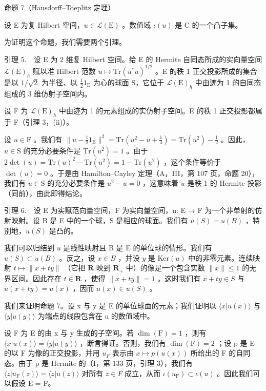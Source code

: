 命题 7（Hausdorff–Toeplitz 定理）

设 E 为复 Hilbert 空间，\(u \in \mathcal{L}(\mathrm{E})\) 。数值域 \(\iota(u)\) 是 C 的一个凸子集。

为证明这个命题，我们需要两个引理。

引理 5.　设 E 为 2 维复 Hilbert 空间。给 E 的 Hermite 自同态所成的实向量空间 \(\mathcal{L}(\mathrm{E})_h\) 赋以准 Hilbert 范数 \(u \mapsto \mathrm{Tr}(u^* u)^{1/2}\) 。E 的秩 1 正交投影所成的集合是以 \(1/\sqrt{2}\) 为半径、以 \(\frac{1}{2} 1_{\mathrm{E}}\) 为心的球面 S，它位于 \(\mathcal{L}(\mathrm{E})_h\) 中由迹为 1 的自同态组成的 3 维仿射子空间内。

设 F 为 \(\mathcal{L}(\mathrm{E})_h\) 中由迹为 1 的元素组成的实仿射子空间。E 的秩 1 正交投影都属于 F（引理 3，(ii)）。

设 \(u \in \mathrm{F}\) 。我们有 \(\| u - \frac{1}{2} 1_{\mathrm{E}} \|^{2} = \mathrm{Tr}(u^{2} - u + \frac{1}{4}) = \mathrm{Tr}(u^{2}) - \frac{1}{2}\) 。因此，\(u \in \mathrm{S}\) 的充分必要条件是 \(\mathrm{Tr}(u^{2}) = 1\) 。由于 \(2\det(u) = \mathrm{Tr}(u)^{2} - \mathrm{Tr}(u^{2}) = 1 - \mathrm{Tr}(u^{2})\) ，这个条件等价于 \(\det(u) = 0\) 。于是由 Hamilton–Cayley 定理（A，III，第 107 页，命题 20），我们有 \(u \in \mathrm{S}\) 的充分必要条件是 \(u^{2} - u = 0\) ，这意味着 \(u\) 是秩 1 的 Hermite 投影（同前），由此即得结论。

引理 6.　设 E 为实赋范向量空间，F 为实向量空间，u: E → F 为一个非单射的仿射映射。设 B 是 E 中的一个球，S 是相应的球面。我们有 \(u(S) = u(B)\) ，特别地，\(u(S)\) 是凸的。

我们可以归结到 \(u\) 是线性映射且 B 是 E 的单位球的情形。我们有 \(u(S) \subset u(B)\) 。反之，设 \(x \in B\) ，并设 \(y\) 是 \(\text{Ker}(u)\) 中的非零元素。连续映射 \(t \mapsto \|x + ty\|\) （它把 \(\mathbf{R}\) 映到 \(\mathbf{R}_+\) 中）的像是一个包含实数 \(\|x\| \leqslant 1\) 的无界区间。因此存在 \(t \in \mathbf{R}\) ，使得 \(\|x + ty\| = 1\) 。这时我们有 \(x + ty \in S\) 与 \(u(x + ty) = u(x)\) ，因而 \(u(x) \in u(S)\) 。

我们来证明命题 7。设 x 与 y 是 E 的单位球面的元素；我们证明以 \(\langle x|u(x)\rangle\) 与 \(\langle y|u(y)\rangle\) 为端点的线段包含在 u 的数值域中。

设 F 为 E 的由 x 与 y 生成的子空间。若 \(\dim(\mathrm{F}) = 1\) ，则有 \(\langle x|u(x)\rangle = \langle y|u(y)\rangle\) ，断言得证。否则，我们有 \(\dim(\mathrm{F}) = 2\) ；设 p 是 E 的以 F 为像的正交投影，并用 \(u_{F}\) 表示由 \(x \mapsto p(u(x))\) 所给出的 F 的自同态。由于 p 是 Hermite 的（I，第 133 页，引理 3），我们有 \(\langle z|u_{\mathrm{F}}(z)\rangle = \langle z|u(z)\rangle\) 对所有 \(z \in F\) 成立，从而 \(\iota(u_{\mathrm{F}}) \subset \iota(u)\) 。因此我们可以假设 E = F。

